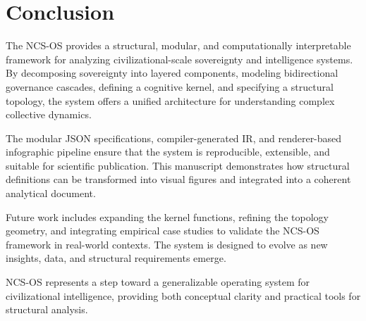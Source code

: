 \section{Conclusion}

The NCS-OS provides a structural, modular, and computationally interpretable framework 
for analyzing civilizational-scale sovereignty and intelligence systems. By decomposing 
sovereignty into layered components, modeling bidirectional governance cascades, defining 
a cognitive kernel, and specifying a structural topology, the system offers a unified 
architecture for understanding complex collective dynamics.

The modular JSON specifications, compiler-generated IR, and renderer-based infographic 
pipeline ensure that the system is reproducible, extensible, and suitable for scientific 
publication. This manuscript demonstrates how structural definitions can be transformed 
into visual figures and integrated into a coherent analytical document.

Future work includes expanding the kernel functions, refining the topology geometry, 
and integrating empirical case studies to validate the NCS-OS framework in real-world 
contexts. The system is designed to evolve as new insights, data, and structural 
requirements emerge.

NCS-OS represents a step toward a generalizable operating system for civilizational 
intelligence, providing both conceptual clarity and practical tools for structural analysis.

